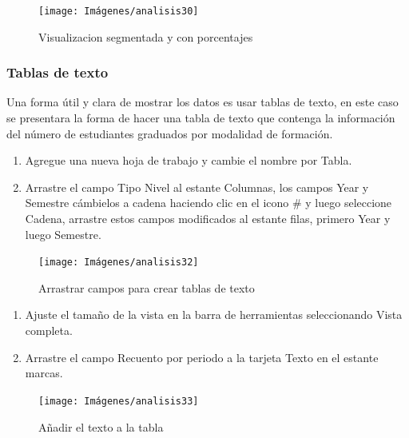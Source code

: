 \documentclass[
]{book}
\begin{document}
\begin{figure}

{\centering \texttt{[image: Imágenes/analisis30]} 

}

\caption{Visualizacion segmentada y con porcentajes}\label{fig:descripcionconporcentaje-fig}
\end{figure}

\hypertarget{tablas-de-texto}{%
\subsubsection{Tablas de texto}\label{tablas-de-texto}}

Una forma útil y clara de mostrar los datos es usar tablas de texto, en este caso se presentara la forma de hacer una tabla de texto que contenga la información del número de estudiantes graduados por modalidad de formación.

\begin{enumerate}
\def\labelenumi{\arabic{enumi}.}
\item
  Agregue una nueva hoja de trabajo y cambie el nombre por Tabla.
\item
  Arrastre el campo Tipo Nivel al estante Columnas, los campos Year y Semestre cámbielos a cadena haciendo clic en el icono \# y luego seleccione Cadena, arrastre estos campos modificados al estante filas, primero Year y luego Semestre.
\end{enumerate}

\begin{figure}

{\centering \texttt{[image: Imágenes/analisis32]} 

}

\caption{Arrastrar campos para crear tablas de texto}\label{fig:paso2tablatexto-fig}
\end{figure}

\begin{enumerate}
\def\labelenumi{\arabic{enumi}.}
\setcounter{enumi}{2}
\item
  Ajuste el tamaño de la vista en la barra de herramientas seleccionando Vista completa.
\item
  Arrastre el campo Recuento por periodo a la tarjeta Texto en el estante marcas.
\end{enumerate}

\begin{figure}

{\centering \texttt{[image: Imágenes/analisis33]} 

}

\caption{Añadir el texto a la tabla}\label{fig:paso4tablatexto-fig}
\end{figure}
\end{document}
